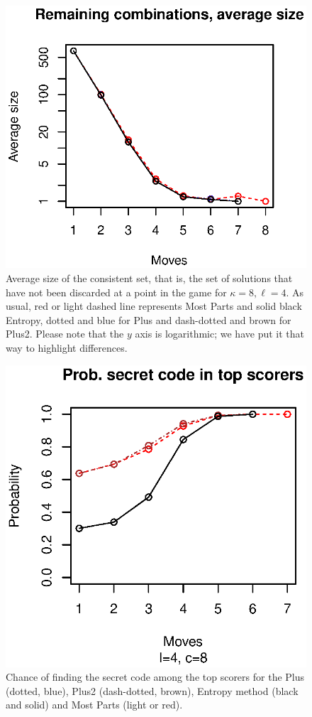 \documentclass[preprint,12pt]{elsarticle}
\begin{document}
\begin{figure}[!htb]
\centering
\includegraphics{csets-plus-4-8.eps}
\caption{Average size of the consistent set, that is, the set of
  solutions that have not been discarded at a point in the game for
  $\kappa=8, \ell=4$. As usual, red or light dashed line 
  represents Most Parts and solid black Entropy, dotted and blue for
  Plus and dash-dotted and brown for Plus2. Please note that the $y$
  axis is logarithmic; we have put it that way to highlight
  differences. \label{fig:cset:plus:48}}
\end{figure} 
%
\begin{figure}[!htb]
\centering
\includegraphics{top-plus-4-8.eps}
\caption{Chance of finding the secret code among the top scorers for
  the Plus (dotted, blue), Plus2 (dash-dotted, brown),
  Entropy method (black and solid) and Most Parts (light or
  red).\label{fig:top:plus:48}}
\end{figure} 
\end{document}
